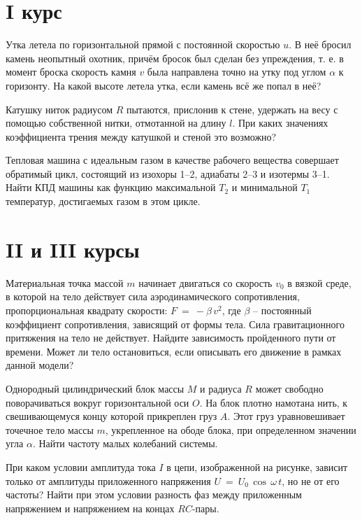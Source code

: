 \section{I курс}

\AddProb Утка летела по горизонтальной прямой с постоянной скоростью $u$. 
В неё бросил камень неопытный охотник, причём бросок был сделан без упреждения, 
т. е. в момент броска скорость камня $v$ была направлена точно на утку под углом $\alpha$ к горизонту. 
На какой высоте летела утка, если камень всё же попал в неё?

\AddProb Катушку ниток радиусом $R$ пытаются, прислонив к стене, удержать на весу с помощью собственной нитки, отмотанной на длину $l$. 
При каких значениях коэффициента трения между катушкой и стеной это возможно?

\AddProb Тепловая машина с идеальным газом в качестве рабочего вещества совершает обратимый цикл, 
состоящий из изохоры 1--2, адиабаты 2--3 и изотермы 3--1. 
Найти КПД машины как функцию максимальной $T_2$ и минимальной $T_1$ температур, достигаемых газом в этом цикле.


\section{II и III курсы}

\AddProb Материальная точка массой $m$ начинает двигаться со скорость $v_0$ в вязкой среде, в которой на тело действует сила аэродинамического сопротивления, 
пропорциональная квадрату скорости: $F~=~-\beta\,v^2$, где $\beta$ -- постоянный коэффициент сопротивления, зависящий от формы тела. 
Сила гравитационного притяжения на тело не действует. Найдите зависимость пройденного пути от времени. 
Может ли тело остановиться, если описывать его движение в рамках данной модели?

\AddProb Однородный цилиндрический блок массы $M$ и радиуса $R$ может свободно поворачиваться вокруг горизонтальной оси $O$. 
На блок плотно намотана нить, к свешивающемуся концу которой прикреплен груз $A$. 
Этот груз уравновешивает точечное тело массы $m$, укрепленное на ободе блока, при определенном значении угла $\alpha$. Найти частоту малых колебаний системы.

\AddProb При каком условии амплитуда тока $I$ в цепи, изображенной на рисунке, зависит только от амплитуды приложенного напряжения 
$U~=~U_0\,\cos\,\omega\,t$, но не от его частоты? Найти при этом условии разность фаз между приложенным напряжением и напряжением на концах $RC$-пары.